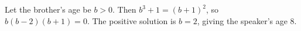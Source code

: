 Let the brother's age be $b>0$. Then $b^3+1=(b+1)^2$, so $b(b-2)(b+1)=0$. The positive solution is $b=2$, giving the speaker's age $\boxed8$.
